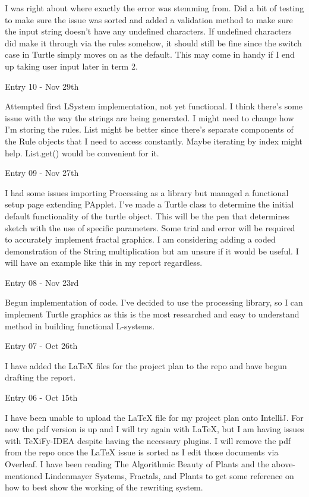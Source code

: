 \documentclass[]{final_report}
\begin{document}
I was right about where exactly the error was stemming from. Did a bit of testing to make sure the issue was sorted and added a validation method to make sure the input string doesn't have any undefined characters.
If undefined characters did make it through via the rules somehow, it should still be fine since the switch case in Turtle simply moves on as the default. This may come in handy if I end up taking user input later in term 2.

Entry 10 - Nov 29th

Attempted first LSystem implementation, not yet functional. I think there's some issue with the way the strings are being generated. I might need to change how I'm storing the rules. List might be better since there's separate components of the Rule objects that I need to access constantly. Maybe iterating by index might help. List.get() would be convenient for it.

Entry 09 - Nov 27th

I had some issues importing Processing as a library but managed a functional setup page extending PApplet. I've made a Turtle class to determine the initial default functionality of the turtle object. This will be the pen that determines sketch with the use of specific parameters. Some trial and error will be required to accurately implement fractal graphics.
I am considering adding a coded demonstration of the String multiplication but am unsure if it would be useful. I will have an example like this in my report regardless.

Entry 08 - Nov 23rd

Begun implementation of code. I've decided to use the processing library, so I can implement Turtle graphics as this is the most researched and easy to understand method in building functional L-systems.

Entry 07 - Oct 26th

I have added the LaTeX files for the project plan to the repo and have begun drafting the report.

Entry 06 - Oct 15th

I have been unable to upload the LaTeX file for my project plan onto IntelliJ. For now the pdf version is up and I will try again with LaTeX, but I am having issues with TeXiFy-IDEA despite having the necessary plugins. I will remove the pdf from the repo once the LaTeX issue is sorted as I edit those documents via Overleaf.
I have been reading The Algorithmic Beauty of Plants and the above-mentioned Lindenmayer Systems, Fractals, and Plants to get some reference on how to best show the working of the rewriting system.
\end{document}
